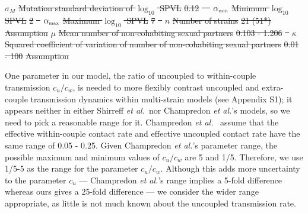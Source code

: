 \documentclass[10pt,letterpaper]{article}
\newcommand{\etal}{\textit{et al.}}
\newcommand{\tsub}[2]{#1_{{\textrm{\tiny #2}}}}
\providecommand{\DIFdeltex}[1]{{\protect\color{red}\sout{#1}}}                      %
\providecommand{\DIFdelend}{} %
\providecommand{\DIFdelFL}[1]{\DIFdel{#1}} %
\providecommand{\DIFdel}[1]{\texorpdfstring{\DIFdeltex{#1}}{}} %
\DeclareRobustCommand{\DIFdelend}{\DIFOaddend \let\includegraphics\DIFOincludegraphics} %
\begin{document}
\DIFdelFL{$\sigma_M$ }%
\DIFdelFL{Mutation standard deviation of $\log_{10}$ SPVL }%
\DIFdelFL{0.12 }%
\DIFdelFL{\mbox{%
\cite{shirreff_transmission_2011} }%
}%
\DIFdelFL{$\tsub{\alpha}{min}$ }%
\DIFdelFL{Minimum $\log_{10}$ SPVL }%
\DIFdelFL{2 }%
\DIFdelFL{\mbox{%
\cite{shirreff_transmission_2011}}%
}%
\DIFdelFL{$\tsub{\alpha}{max}$ }%
\DIFdelFL{Maximum $\log_{10}$ SPVL }%
\DIFdelFL{7 }%
\DIFdelFL{\mbox{%
\cite{shirreff_transmission_2011}}%
}%
\DIFdelFL{$n$ }%
\DIFdelFL{Number of strains }%
\DIFdelFL{21 (51*) }%
\DIFdelFL{Assumption}%
\DIFdelFL{$\mu$ }%
\DIFdelFL{Mean number of non-cohabiting sexual partners }%
\DIFdelFL{0.103 - 1.206 }%
\DIFdelFL{\mbox{%
\cite{omori2015dynamics}}%
}%
\DIFdelFL{$\kappa$ }%
\DIFdelFL{Squared coefficient of variation of number of non-cohabiting sexual partners }%
\DIFdelFL{0.01 - 100 }%
\DIFdelFL{Assumption}%

\DIFdelend One parameter in our model, the ratio of uncoupled to within-couple transmission $c_u/c_w$, is needed to more flexibly contrast uncoupled and extra-couple transmission dynamics within multi-strain models (see Appendix S1);
it appears neither in either Shirreff \etal\ nor Champredon \etal's models,  so we need to pick a reasonable range for it. Champredon \etal\ \cite{champredon_hiv_2013} assume that the effective within-couple contact rate and effective uncoupled contact rate have the same range of 0.05 - 0.25.  Given Champredon \etal's parameter range, the possible maximum and minimum values of $c_u/c_w$ are 5 and 1/5. Therefore, we use 1/5-5 as the range for the parameter $c_u/c_w$. Although this adds more uncertainty to the parameter $c_u$ --- Champredon \etal's range implies a 5-fold difference whereas ours gives a 25-fold difference --- we consider the wider range appropriate, as little is not much known about the uncoupled transmission rate.
\end{document}
